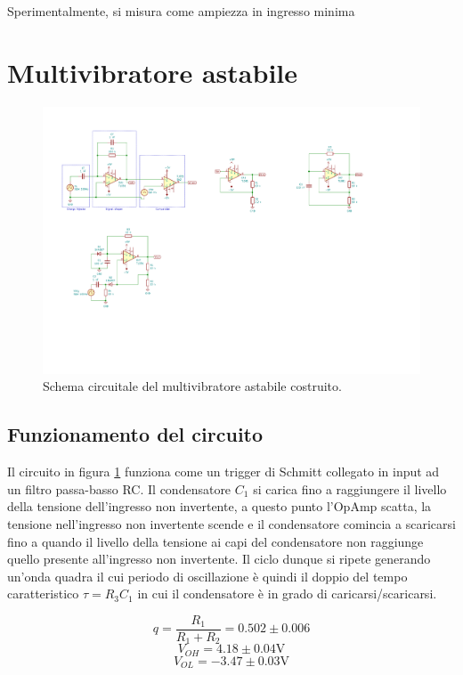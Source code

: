 \documentclass[10pt,a4paper]{article}
\begin{document}
Sperimentalmente, si misura come ampiezza in ingresso minima

\section{Multivibratore astabile}

\begin{figure}[htbp]
    \centering
	\includegraphics[scale=1.5]{astable}
    \caption{Schema circuitale del multivibratore astabile costruito.
    \label{fig: astableschm}}
\end{figure}

\subsection{Funzionamento del circuito}
Il circuito in figura \ref{fig: astableschm} funziona come un trigger di
Schmitt collegato in input ad un filtro passa-basso RC. Il condensatore $C_1$ si
carica fino a raggiungere il livello della tensione dell’ingresso non
invertente, a questo punto l’OpAmp scatta, la tensione nell’ingresso non invertente
scende e il condensatore comincia a scaricarsi fino a quando il livello della
tensione ai capi del condensatore non raggiunge quello presente all’ingresso
non invertente.
Il ciclo dunque si ripete generando un'onda quadra il cui periodo di
oscillazione è quindi il doppio del tempo caratteristico $\tau = R_3 C_1$ in
cui il condensatore è in grado di caricarsi/scaricarsi.

\[
q = \frac{R_1}{R_1 + R_2}=0.502 \pm 0.006
\]
\[ 
V_{OH}=4.18 \pm 0.04 \si{\V}
\]
\[
V_{OL}=-3.47 \pm 0.03 \si{\V}
\]
\end{document}
